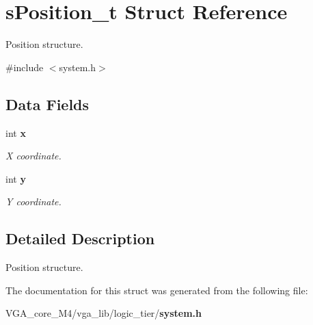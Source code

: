 \section{s\+Position\+\_\+t Struct Reference}
\label{structs_position__t}


Position structure.  




{\ttfamily \#include $<$system.\+h$>$}

\subsection*{Data Fields}
\begin{DoxyCompactItemize}
\item 
int {\bf x}\label{structs_position__t_a6150e0515f7202e2fb518f7206ed97dc}

\begin{DoxyCompactList}\small\item\em X coordinate. \end{DoxyCompactList}\item 
int {\bf y}\label{structs_position__t_a0a2f84ed7838f07779ae24c5a9086d33}

\begin{DoxyCompactList}\small\item\em Y coordinate. \end{DoxyCompactList}\end{DoxyCompactItemize}


\subsection{Detailed Description}
Position structure. 

The documentation for this struct was generated from the following file\+:\begin{DoxyCompactItemize}
\item 
V\+G\+A\+\_\+core\+\_\+\+M4/vga\+\_\+lib/logic\+\_\+tier/{\bf system.\+h}\end{DoxyCompactItemize}
